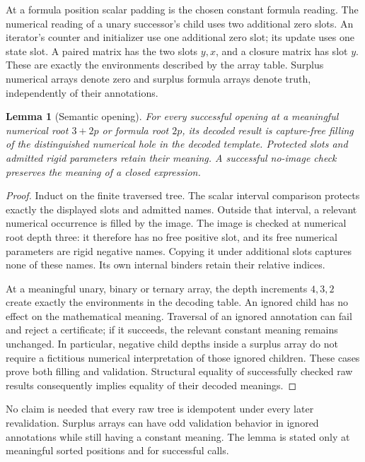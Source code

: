 \documentclass[11pt,letterpaper]{article}
\newtheorem{lemma}[theorem]{Lemma}
\theoremstyle{definition}\newtheorem{definition}[theorem]{Definition}
\theoremstyle{remark}\newtheorem{remark}[theorem]{Remark}
\begin{document}
At a formula position scalar padding is the chosen constant formula
reading. The numerical reading of a unary successor's child uses two
additional zero slots. An iterator's counter and initializer use one
additional zero slot; its update uses one state slot. A paired matrix
has the two slots \(y,x\), and a closure matrix has slot \(y\).
These are exactly the environments described by the array table.
Surplus numerical arrays denote zero and surplus formula arrays denote
truth, independently of their annotations.

\begin{lemma}[Semantic opening]
For every successful opening at a meaningful numerical root
\(3+2p\) or formula root \(2p\), its decoded result is capture-free
filling of the distinguished numerical hole in the decoded template.
Protected slots and admitted rigid parameters retain their meaning.
A successful no-image check preserves the meaning of a closed expression.
\end{lemma}
\begin{proof}
Induct on the finite traversed tree. The scalar interval comparison
protects exactly the displayed slots and admitted names. Outside that
interval, a relevant numerical occurrence is filled by the image. The
image is checked at numerical root depth three: it therefore has no
free positive slot, and its free numerical parameters are rigid negative
names. Copying it under additional slots captures none of these names.
Its own internal binders retain their relative indices.

At a meaningful unary, binary or ternary array, the depth increments
\(4,3,2\) create exactly the environments in the decoding table.
An ignored child has no effect on the mathematical meaning. Traversal
of an ignored annotation can fail and reject a certificate; if it
succeeds, the relevant constant meaning remains unchanged. In
particular, negative child depths inside a surplus array do not require
a fictitious numerical interpretation of those ignored children.
These cases prove both filling and validation. Structural equality of
successfully checked raw results consequently implies equality of
their decoded meanings.
\end{proof}

No claim is needed that every raw tree is idempotent under every later
revalidation. Surplus arrays can have odd validation behavior in ignored
annotations while still having a constant meaning. The lemma is stated
only at meaningful sorted positions and for successful calls.
\end{document}
